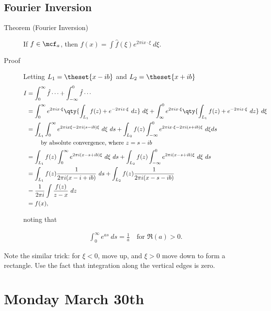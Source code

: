 \hypertarget{fourier-inversion}{%
\subsection{Fourier Inversion}\label{fourier-inversion}}

\begin{description}
\item[Theorem (Fourier Inversion)]
If \(f\in \mcf_a\), then
\(f(x) = \int \hat f(\xi) e^{2\pi i x\cdot \xi} ~d\xi\).
\item[Proof]
Letting \(L_1 = \theset{x-ib}\) and \(L_2 = \theset{x+ib}\)
\begin{align*}
I 
&= \int_0^\infty \hat f \cdots + \int_{-\infty}^0 \hat f \cdots \\
&= \int_0^\infty e^{2\pi i x \cdot \xi} \qty{ \int_{L_1} f(z) + e^{-2\pi i z \cdot \xi} ~dz } ~d\xi
+ \int_{\infty}^0 e^{2\pi i x \cdot \xi} \qty{ \int_{L_1} f(z) + e^{-2\pi i z \cdot \xi} ~dz } ~d\xi \\
&= \int_{L_1} \int_0^\infty e^{2\pi i x \xi - 2\pi i (s-ib)\xi} ~d\xi ~ds 
+ \int_{L_2} f(z) \int_{-\infty}^0 e^{2\pi i x \cdot \xi - 2\pi i (s + ib)\xi} ~d\xi ds\\
& \quad \quad\text{ by absolute convergence, where } z = s-ib \\
&= \int_{L_1} f(z) \int_0^\infty e^{2\pi i (x - s + ib)\xi} ~d\xi ~ds 
+ \int_{L_2} f(z) \int_{-\infty}^0 e^{2\pi i (x - s + ib)\xi} ~d\xi ~ds \\
&= \int_{L_1} f(z) \frac{1}{2\pi i (x - i + ib)} ~ds
+ \int_{L_2} f(z) \frac{1}{2\pi i (x - s - ib)} \\
&= \frac{1}{2\pi i} \int \frac{f(z)} {z - x} ~dz \\
&= f(x)
,\end{align*}

noting that

\begin{align*}
\int_0^\infty e^{as} ~ds = \frac 1 a \quad\text{for }\Re(a) > 0
.\end{align*}
\end{description}

Note the similar trick: for \(\xi < 0\), move up, and \(\xi > 0\) move
down to form a rectangle. Use the fact that integration along the
vertical edges is zero.

\hypertarget{monday-march-30th}{%
\section{Monday March 30th}\label{monday-march-30th}}

